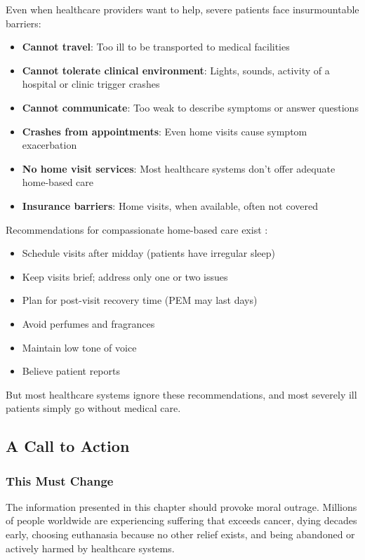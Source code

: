 Even when healthcare providers want to help, severe patients face insurmountable barriers:

\begin{itemize}
    \item \textbf{Cannot travel}: Too ill to be transported to medical facilities
    \item \textbf{Cannot tolerate clinical environment}: Lights, sounds, activity of a hospital or clinic trigger crashes
    \item \textbf{Cannot communicate}: Too weak to describe symptoms or answer questions
    \item \textbf{Crashes from appointments}: Even home visits cause symptom exacerbation
    \item \textbf{No home visit services}: Most healthcare systems don't offer adequate home-based care
    \item \textbf{Insurance barriers}: Home visits, when available, often not covered
\end{itemize}

Recommendations for compassionate home-based care exist \cite{Kingdon2020housebound}:
\begin{itemize}
    \item Schedule visits after midday (patients have irregular sleep)
    \item Keep visits brief; address only one or two issues
    \item Plan for post-visit recovery time (PEM may last days)
    \item Avoid perfumes and fragrances
    \item Maintain low tone of voice
    \item Believe patient reports
\end{itemize}

But most healthcare systems ignore these recommendations, and most severely ill patients simply go without medical care.

\subsection{A Call to Action}
\label{sec:call-to-action}

\subsubsection{This Must Change}
\label{subsec:must-change}

The information presented in this chapter should provoke moral outrage. Millions of people worldwide are experiencing suffering that exceeds cancer, dying decades early, choosing euthanasia because no other relief exists, and being abandoned or actively harmed by healthcare systems.


